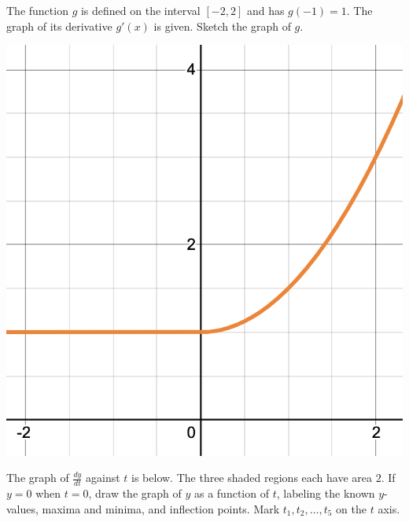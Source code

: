 \documentclass[11pt]{exam}
\begin{document}
\begin{questions}
  \begin{minipage}{0.5\linewidth}
    The function $g$ is defined on the interval $[-2,2]$ and has
    $g(-1)=1$. The graph of its derivative $g'(x)$ is given. Sketch
    the graph of $g$.
  \end{minipage}
  \begin{minipage}{0.5\linewidth}
  \end{minipage}
  \begin{solution}
   \includegraphics[scale=0.5]{Figures/4}
  \end{solution}
  \pagebreak
\question The graph of \(\frac{dy}{dt}\) against \(t\) is below. The
  three shaded regions each have area \(2\). If \(y=0\) when \(t=0\), 
  draw the graph of \(y\) as a function of \(t\), labeling the known
  \(y\)-values, maxima and minima, and inflection points. Mark \(t_1,
  t_2, \ldots, t_5\) on the \(t\) axis.


\end{questions}
\end{document}
